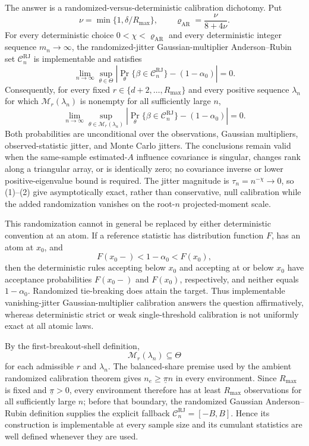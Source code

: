 The answer is a randomized-versus-deterministic calibration dichotomy.  Put
\[
 \nu=\min\{1,\delta/R_{\max}\},
 \qquad
 \varrho_{\mathrm{AR}}=\frac{\nu}{8+4\nu}.
\]
For every deterministic choice \(0<\chi<\varrho_{\mathrm{AR}}\) and every deterministic integer sequence \(m_n\to\infty\), the randomized-jitter Gaussian-multiplier Anderson--Rubin set \(\mathcal C_n^{\mathrm{RJ}}\) is implementable and satisfies
\[
 \lim_{n\to\infty}
 \sup_{\theta\in\Theta}
 \left|
 \Pr_\theta\{\beta\in\mathcal C_n^{\mathrm{RJ}}\}
 -(1-\alpha_0)
 \right|=0.                                                   \tag{1}
\]
Consequently, for every fixed \(r\in\{d+2,\ldots,R_{\max}\}\) and every positive sequence \(\lambda_n\) for which \(\mathcal M_r(\lambda_n)\) is nonempty for all sufficiently large \(n\),
\[
 \lim_{n\to\infty}
 \sup_{\theta\in\mathcal M_r(\lambda_n)}
 \left|
 \Pr_\theta\{\beta\in\mathcal C_n^{\mathrm{RJ}}\}
 -(1-\alpha_0)
 \right|=0.                                                   \tag{2}
\]
Both probabilities are unconditional over the observations, Gaussian multipliers, observed-statistic jitter, and Monte Carlo jitters.  The conclusions remain valid when the same-sample estimated-\(A\) influence covariance is singular, changes rank along a triangular array, or is identically zero; no covariance inverse or lower positive-eigenvalue bound is required.  The jitter magnitude is \(\tau_n=n^{-\chi}\to0\), so (1)--(2) give asymptotically exact, rather than conservative, null calibration while the added randomization vanishes on the root-\(n\) projected-moment scale.

This randomization cannot in general be replaced by either deterministic convention at an atom.  If a reference statistic has distribution function \(F\), has an atom at \(x_0\), and
\[
 F(x_0-)<1-\alpha_0<F(x_0),                                  \tag{3}
\]
then the deterministic rules accepting below \(x_0\) and accepting at or below \(x_0\) have acceptance probabilities \(F(x_0-)\) and \(F(x_0)\), respectively, and neither equals \(1-\alpha_0\).  Randomized tie-breaking does attain the target.  Thus implementable vanishing-jitter Gaussian-multiplier calibration answers the question affirmatively, whereas deterministic strict or weak single-threshold calibration is not uniformly exact at all atomic laws.

By the first-breakout-shell definition,
\[
 \mathcal M_r(\lambda_n)\subseteq\Theta                         \tag{4}
\]
for each admissible \(r\) and \(\lambda_n\).  The balanced-share premise used by the ambient randomized calibration theorem gives \(n_e\geq\underline\pi n\) in every environment.  Since \(R_{\max}\) is fixed and \(\underline\pi>0\), every environment therefore has at least \(R_{\max}\) observations for all sufficiently large \(n\); before that boundary, the randomized Gaussian Anderson--Rubin definition supplies the explicit fallback \(\mathcal C_n^{\mathrm{RJ}}=[-B,B]\).  Hence its construction is implementable at every sample size and its cumulant statistics are well defined whenever they are used.

